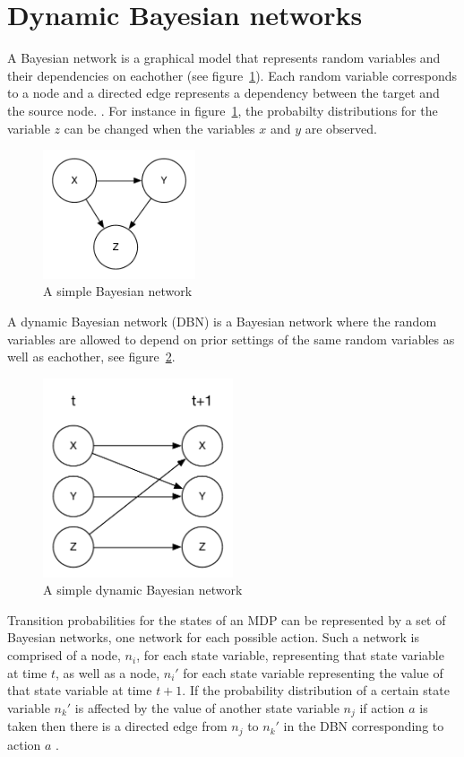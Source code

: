 \section{Dynamic Bayesian networks}

A Bayesian network is a graphical model that represents random variables and
their dependencies on eachother (see figure~\ref{fig:bn}). Each random variable
corresponds to a node and a directed edge represents a dependency between the
target and the source node. \parencite{heckerman1998tutorial}. For instance in
figure~\ref{fig:bn}, the probabilty distributions for the variable $z$ can be
changed when the variables $x$ and $y$ are observed. 

\begin{figure}[H]
\centering
\includegraphics[width=0.4\textwidth]{images/BN.pdf}
\caption{A simple Bayesian network}
\label{fig:bn}
\end{figure}

A dynamic Bayesian network (DBN) is a Bayesian network where the random variables are allowed to depend on prior settings of the same random variables as well as eachother, see figure~\ref{fig:dbn}.

\begin{figure}[H]
    \centering
    \includegraphics[width=0.5\textwidth]{images/DBN.pdf}
    \caption{A simple dynamic Bayesian network}
    \label{fig:dbn}
\end{figure}

Transition probabilities for the states of an MDP can be represented by a set of Bayesian networks, one network for each possible action. Such a network is comprised of a node, $n_i$, for each state variable, representing that state variable at time $t$, as well as a node, $n_i'$ for each state variable representing the value of that state variable at time $t+1$. If the probability distribution of a certain state variable $n_k'$ is affected by the value of another state variable $n_j$ if action $a$ is taken then there is a directed edge from $n_j$ to $n_k'$ in the DBN corresponding to action $a$ \parencite{guestrin2003efficient}.
